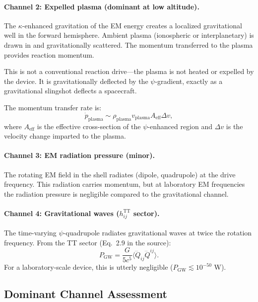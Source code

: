 \documentclass[12pt, letterpaper]{article}
\theoremstyle{definition}
\theoremstyle{remark}
\begin{document}
\paragraph{Channel 2: Expelled plasma (dominant at low altitude).}

The $\kappa$-enhanced gravitation of the EM energy creates a localized
gravitational well in the forward hemisphere. Ambient plasma (ionospheric or
interplanetary) is drawn in and gravitationally scattered. The momentum
transferred to the plasma provides reaction momentum.

This is not a conventional reaction drive---the plasma is not heated or
expelled by the device. It is gravitationally deflected by the $\psi$-gradient,
exactly as a gravitational slingshot deflects a spacecraft.

The momentum transfer rate is:
\begin{equation}
\dot{p}_{\mathrm{plasma}} \sim \rho_{\mathrm{plasma}} v_{\mathrm{plasma}} A_{\mathrm{eff}} \Delta v,
\end{equation}
where $A_{\mathrm{eff}}$ is the effective cross-section of the $\psi$-enhanced
region and $\Delta v$ is the velocity change imparted to the plasma.

\paragraph{Channel 3: EM radiation pressure (minor).}

The rotating EM field in the shell radiates (dipole, quadrupole) at the drive
frequency. This radiation carries momentum, but at laboratory EM frequencies
the radiation pressure is negligible compared to the gravitational channel.

\paragraph{Channel 4: Gravitational waves ($h_{ij}^{\mathrm{TT}}$ sector).}

The time-varying $\psi$-quadrupole radiates gravitational waves at twice the
rotation frequency. From the TT sector (Eq.~2.9 in the source):
\begin{equation}
P_{\mathrm{GW}} = \frac{G}{5c^5} \langle \dddot{Q}_{ij} \dddot{Q}^{ij} \rangle.
\end{equation}
For a laboratory-scale device, this is utterly negligible
($P_{\mathrm{GW}} \lesssim 10^{-50}$ W).

\subsection{Dominant Channel Assessment}
\end{document}
